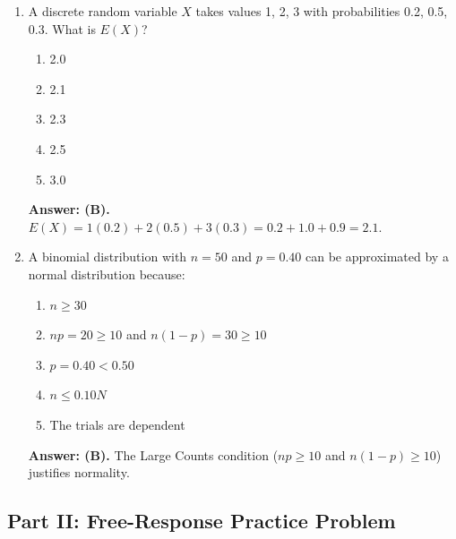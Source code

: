 \begin{enumerate}[resume, leftmargin=1.5em]
  \item A discrete random variable $X$ takes values 1, 2, 3 with probabilities 0.2, 0.5, 0.3. What is $E(X)$?
  \begin{enumerate}[label=(\Alph*)]
    \item 2.0 \item 2.1 \item 2.3 \item 2.5 \item 3.0
  \end{enumerate}
  \textbf{Answer: (B).} $E(X) = 1(0.2) + 2(0.5) + 3(0.3) = 0.2 + 1.0 + 0.9 = 2.1$.

  \item A binomial distribution with $n = 50$ and $p = 0.40$ can be approximated by a normal distribution because:
  \begin{enumerate}[label=(\Alph*)]
    \item $n \ge 30$
    \item $np = 20 \ge 10$ and $n(1-p) = 30 \ge 10$
    \item $p = 0.40 < 0.50$
    \item $n \le 0.10N$
    \item The trials are dependent
  \end{enumerate}
  \textbf{Answer: (B).} The Large Counts condition ($np \ge 10$ and $n(1-p) \ge 10$) justifies normality.
\end{enumerate}

\subsection*{Part II: Free-Response Practice Problem}


